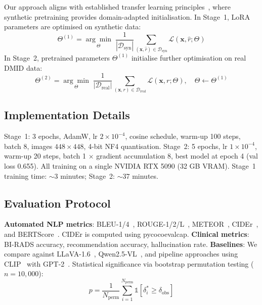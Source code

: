 \documentclass{wlscirep}
\begin{document}
Our approach aligns with established transfer learning principles~\cite{pan2010transfer, zhuang2021survey}, where synthetic pretraining provides domain-adapted initialisation. In Stage~1, LoRA parameters are optimised on synthetic data:
\begin{equation}
\Theta^{(1)} = \underset{\Theta}{\arg\min} \; \frac{1}{|\mathcal{D}_{\text{syn}}|} \sum_{(\mathbf{x}, \hat{r}) \in \mathcal{D}_{\text{syn}}} \mathcal{L}(\mathbf{x}, \hat{r}; \Theta)
\end{equation}
In Stage~2, pretrained parameters $\Theta^{(1)}$ initialise further optimisation on real DMID data:
\begin{equation}
\Theta^{(2)} = \underset{\Theta}{\arg\min} \; \frac{1}{|\mathcal{D}_{\text{real}}|} \sum_{(\mathbf{x}, r) \in \mathcal{D}_{\text{real}}} \mathcal{L}(\mathbf{x}, r; \Theta), \quad \Theta \leftarrow \Theta^{(1)}
\end{equation}

\subsection*{Implementation Details}

Stage~1: 3 epochs, AdamW, lr $2 \times 10^{-4}$, cosine schedule, warm-up 100 steps, batch 8, images $448 \times 448$, 4-bit NF4 quantisation. Stage~2: 5 epochs, lr $1 \times 10^{-4}$, warm-up 20 steps, batch 1 $\times$ gradient accumulation 8, best model at epoch 4 (val loss 0.655). All training on a single NVIDIA RTX 5090 (32 GB VRAM). Stage~1 training time: $\sim$3 minutes; Stage~2: $\sim$37 minutes.

\subsection*{Evaluation Protocol}

\textbf{Automated NLP metrics}: BLEU-1/4~\cite{papineni2002bleu}, ROUGE-1/2/L~\cite{lin2004rouge}, METEOR~\cite{banerjee2005meteor}, CIDEr~\cite{vedantam2015cider}, and BERTScore~\cite{zhang2020bertscore}. CIDEr is computed using pycocoevalcap. \textbf{Clinical metrics}: BI-RADS accuracy, recommendation accuracy, hallucination rate. \textbf{Baselines}: We compare against LLaVA-1.6~\cite{liu2024llava}, Qwen2.5-VL~\cite{wang2024qwen2vl}, and pipeline approaches using CLIP~\cite{radford2021clip} with GPT-2~\cite{radford2019gpt2}. Statistical significance via bootstrap permutation testing ($n=10{,}000$):
\begin{equation}
p = \frac{1}{N_{\text{perm}}} \sum_{i=1}^{N_{\text{perm}}} \mathbb{1}[\delta^*_i \geq \delta_{\text{obs}}]
\end{equation}
\end{document}
